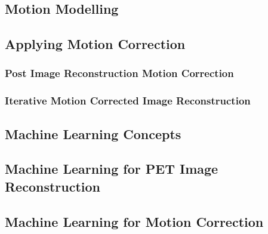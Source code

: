         \subsection{Motion Modelling} \label{motion_modelling}
            \blindtext
        
        \subsection{Applying Motion Correction} \label{applying_motion_correction}
            \blindtext
            
            \subsubsection{Post Image Reconstruction Motion Correction} \label{post_image_reconstruction_motion_correction}
                \blindtext
                
            \subsubsection{Iterative Motion Corrected Image Reconstruction} \label{iterative_motion_corrected_image_reconstruction}
                \blindtext
    
        \blindtext
        
        \subsection{Machine Learning Concepts} \label{machine_learning_concepts}
            \blindtext
        
        \subsection{Machine Learning for PET Image Reconstruction} \label{machine_learning_for_pet_image_reconstruction}
            \blindtext
        
        \subsection{Machine Learning for Motion Correction} \label{machine_learning_for_motion_correction}
            \blindtext
